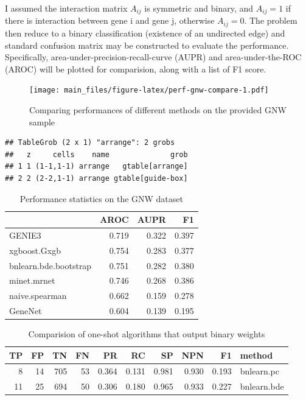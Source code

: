 \documentclass[]{article}
\theoremstyle{definition}
\theoremstyle{definition}
\theoremstyle{definition}
\theoremstyle{remark}
\begin{document}
I assumed the interaction matrix \(A_{ij}\) is symmetric and binary, and
\(A_{ij}=1\) if there is interaction between gene i and gene j,
otherwise \(A_{ij}=0\). The problem then reduce to a binary
classification (existence of an undirected edge) and standard confusion
matrix may be constructed to evaluate the performance. Specifically,
area-under-precision-recall-curve (AUPR) and area-under-the-ROC (AROC)
will be plotted for comparision, along with a list of F1 score.

\begin{figure}
\centering
\texttt{[image: main\_files/figure-latex/perf-gnw-compare-1.pdf]}
\caption{\label{fig:perf-gnw-compare}Comparing performances of different
methods on the provided GNW sample}
\end{figure}

\begin{verbatim}
## TableGrob (2 x 1) "arrange": 2 grobs
##   z     cells    name              grob
## 1 1 (1-1,1-1) arrange   gtable[arrange]
## 2 2 (2-2,1-1) arrange gtable[guide-box]
\end{verbatim}

\begin{table}

\caption{\label{tab:perf-gnw}Performance statistics on the GNW dataset}
\centering
\begin{tabular}[t]{l|r|r|r}
\hline
  & AROC & AUPR & F1\\
\hline
GENIE3 & 0.719 & 0.322 & 0.397\\
\hline
xgboost.Gxgb & 0.754 & 0.283 & 0.377\\
\hline
bnlearn.bde.bootstrap & 0.751 & 0.282 & 0.380\\
\hline
minet.mrnet & 0.746 & 0.268 & 0.386\\
\hline
naive.spearman & 0.662 & 0.159 & 0.278\\
\hline
GeneNet & 0.604 & 0.139 & 0.195\\
\hline
\end{tabular}
\end{table}

\begin{table}

\caption{\label{tab:one-shot}Comparision of one-shot algorithms that output binary weights}
\centering
\begin{tabular}[t]{r|r|r|r|r|r|r|r|r|l}
\hline
TP & FP & TN & FN & PR & RC & SP & NPN & F1 & method\\
\hline
8 & 14 & 705 & 53 & 0.364 & 0.131 & 0.981 & 0.930 & 0.193 & bnlearn.pc\\
\hline
11 & 25 & 694 & 50 & 0.306 & 0.180 & 0.965 & 0.933 & 0.227 & bnlearn.bde\\
\hline
\end{tabular}
\end{table}
\end{document}
